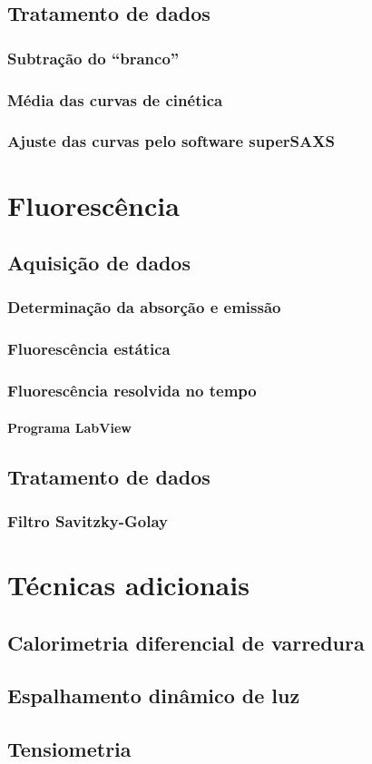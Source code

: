 		\section{Tratamento de dados}
			\subsection{Subtração do ``branco''}
			\subsection{Média das curvas de cinética}
			\subsection{Ajuste das curvas pelo software superSAXS}
	\chapter{Fluorescência}
		\section{Aquisição de dados}
			\subsection{Determinação da absorção e emissão}
			\subsection{Fluorescência estática}
			\subsection{Fluorescência resolvida no tempo}
				\subsubsection{Programa LabView}
		\section{Tratamento de dados}
			\subsection{Filtro Savitzky-Golay}
	\chapter{Técnicas adicionais}
		\section{Calorimetria diferencial de varredura}
		\section{Espalhamento dinâmico de luz}
		\section{Tensiometria}